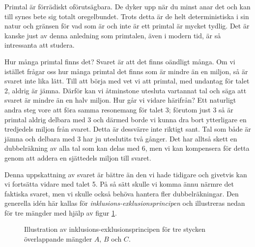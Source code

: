 
Primtal är förrädiskt oförutsägbara.
De dyker upp när du minst anar det och kan till synes bete sig totalt oregelbundet.
Trots detta är de helt deterministiska i sin natur och gränsen för vad som är och inte är ett primtal är mycket tydlig.
Det är kanske just av denna anledning som primtalen, även i modern tid, är så intressanta att studera.


Hur många primtal finns det? Svaret är att det finns oändligt många.
Om vi istället frågar oss hur många primtal det finns som är mindre än en miljon, så är svaret inte lika lätt.
Till att börja med vet vi att primtal, med undantag för talet 2, aldrig är jämna.
Därför kan vi åtminstone utesluta vartannat tal och säga att svaret är mindre än en halv miljon.
Hur går vi vidare härifrån?
Ett naturligt andra steg vore att föra samma resonemang för talet 3;
förutom just 3 så är primtal aldrig delbara med 3 och därmed borde vi kunna dra bort ytterligare en tredjedels miljon från svaret.
Detta är dessvärre inte riktigt sant.
Tal som både är jämna och delbara med 3 har ju uteslutits två gånger.
Det har alltså skett en dubbelräkning av alla tal som kan delas med 6,
men vi kan kompensera för detta genom att addera en sjättedels miljon till svaret.


Denna uppskattning av svaret är bättre än den vi hade tidigare och givetvis kan vi fortsätta vidare med talet 5.
På så sätt skulle vi komma ännu närmre det faktiska svaret, 
men vi skulle också behöva hantera fler dubbelräkningar.
Den generella idén här kallas för \textit{inklusions-exklusionsprincipen} och illustreras nedan för tre mängder med hjälp av figur \ref{pop.fig}.

\begin{figure}[H]
    \centering
    
    \caption{Illustration av inklusions-exklusionsprincipen för tre stycken överlappande mängder $A$, $B$ och $C$.}
    \label{pop.fig}
\end{figure}

